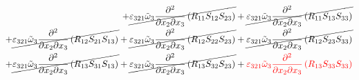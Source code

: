 \begin{equation}
\begin{split}
		+\cancel{\varepsilon_{321}\tilde{\omega}_{3}\pdv{}{x_{2}}{x_{3}}\left(R_{11}S_{12}S_{23}\right)}
		+\cancel{\varepsilon_{321}\tilde{\omega}_{3}\pdv{}{x_{2}}{x_{3}}\left(R_{11}S_{13}S_{33}\right)}\\
		+\cancel{\varepsilon_{321}\tilde{\omega}_{3}\pdv{}{x_{2}}{x_{3}}\left(R_{12}S_{21}S_{13}\right)}
		+\cancel{\varepsilon_{321}\tilde{\omega}_{3}\pdv{}{x_{2}}{x_{3}}\left(R_{12}S_{22}S_{23}\right)}
		+\cancel{\varepsilon_{321}\tilde{\omega}_{3}\pdv{}{x_{2}}{x_{3}}\left(R_{12}S_{23}S_{33}\right)}\\
		+\cancel{\varepsilon_{321}\tilde{\omega}_{3}\pdv{}{x_{2}}{x_{3}}\left(R_{13}S_{31}S_{13}\right)}
		+\cancel{\varepsilon_{321}\tilde{\omega}_{3}\pdv{}{x_{2}}{x_{3}}\left(R_{13}S_{32}S_{23}\right)}
		+{\color{red}\varepsilon_{321}\tilde{\omega}_{3}\pdv{}{x_{2}}{x_{3}}\left(R_{13}S_{33}S_{33}\right)}\\
	\end{split}
\end{equation}
